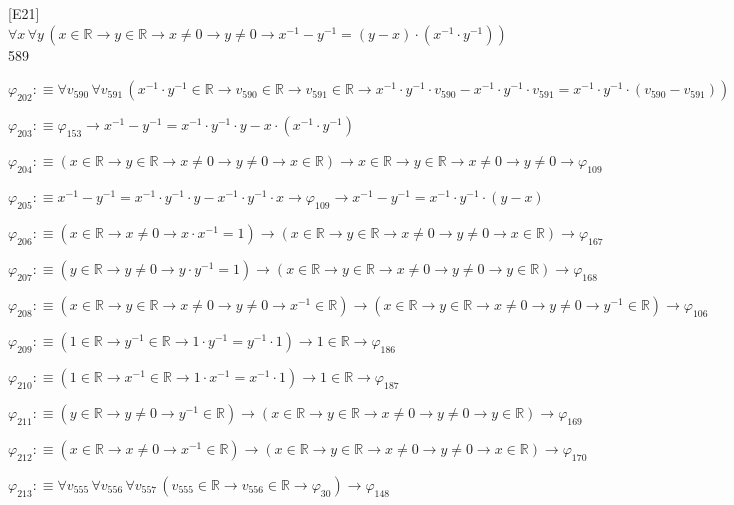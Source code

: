 \begin{fullproof}{[E21]}{$\forall x\,\forall y\,(x \in \mathbb{R} \to y \in \mathbb{R} \to x \neq 0 \to y \neq 0 \to x^{-1} - y^{-1} = (y - x) \cdot (x^{-1} \cdot y^{-1}))$}{589}
\begin{abbrevlist}
\item $\varphi_{202} :\equiv \forall v_{590}\,\forall v_{591}\,(x^{-1} \cdot y^{-1} \in \mathbb{R} \to v_{590} \in \mathbb{R} \to v_{591} \in \mathbb{R} \to x^{-1} \cdot y^{-1} \cdot v_{590} - x^{-1} \cdot y^{-1} \cdot v_{591} = x^{-1} \cdot y^{-1} \cdot (v_{590} - v_{591}))$
\item $\varphi_{203} :\equiv \varphi_{153} \to x^{-1} - y^{-1} = x^{-1} \cdot y^{-1} \cdot y - x \cdot (x^{-1} \cdot y^{-1})$
\item $\varphi_{204} :\equiv (x \in \mathbb{R} \to y \in \mathbb{R} \to x \neq 0 \to y \neq 0 \to x \in \mathbb{R}) \to x \in \mathbb{R} \to y \in \mathbb{R} \to x \neq 0 \to y \neq 0 \to \varphi_{109}$
\item $\varphi_{205} :\equiv x^{-1} - y^{-1} = x^{-1} \cdot y^{-1} \cdot y - x^{-1} \cdot y^{-1} \cdot x \to \varphi_{109} \to x^{-1} - y^{-1} = x^{-1} \cdot y^{-1} \cdot (y - x)$
\item $\varphi_{206} :\equiv (x \in \mathbb{R} \to x \neq 0 \to x \cdot x^{-1} = 1) \to (x \in \mathbb{R} \to y \in \mathbb{R} \to x \neq 0 \to y \neq 0 \to x \in \mathbb{R}) \to \varphi_{167}$
\item $\varphi_{207} :\equiv (y \in \mathbb{R} \to y \neq 0 \to y \cdot y^{-1} = 1) \to (x \in \mathbb{R} \to y \in \mathbb{R} \to x \neq 0 \to y \neq 0 \to y \in \mathbb{R}) \to \varphi_{168}$
\item $\varphi_{208} :\equiv (x \in \mathbb{R} \to y \in \mathbb{R} \to x \neq 0 \to y \neq 0 \to x^{-1} \in \mathbb{R}) \to (x \in \mathbb{R} \to y \in \mathbb{R} \to x \neq 0 \to y \neq 0 \to y^{-1} \in \mathbb{R}) \to \varphi_{106}$
\item $\varphi_{209} :\equiv (1 \in \mathbb{R} \to y^{-1} \in \mathbb{R} \to 1 \cdot y^{-1} = y^{-1} \cdot 1) \to 1 \in \mathbb{R} \to \varphi_{186}$
\item $\varphi_{210} :\equiv (1 \in \mathbb{R} \to x^{-1} \in \mathbb{R} \to 1 \cdot x^{-1} = x^{-1} \cdot 1) \to 1 \in \mathbb{R} \to \varphi_{187}$
\item $\varphi_{211} :\equiv (y \in \mathbb{R} \to y \neq 0 \to y^{-1} \in \mathbb{R}) \to (x \in \mathbb{R} \to y \in \mathbb{R} \to x \neq 0 \to y \neq 0 \to y \in \mathbb{R}) \to \varphi_{169}$
\item $\varphi_{212} :\equiv (x \in \mathbb{R} \to x \neq 0 \to x^{-1} \in \mathbb{R}) \to (x \in \mathbb{R} \to y \in \mathbb{R} \to x \neq 0 \to y \neq 0 \to x \in \mathbb{R}) \to \varphi_{170}$
\item $\varphi_{213} :\equiv \forall v_{555}\,\forall v_{556}\,\forall v_{557}\,(v_{555} \in \mathbb{R} \to v_{556} \in \mathbb{R} \to \varphi_{30}) \to \varphi_{148}$

\end{abbrevlist}
\end{fullproof}
